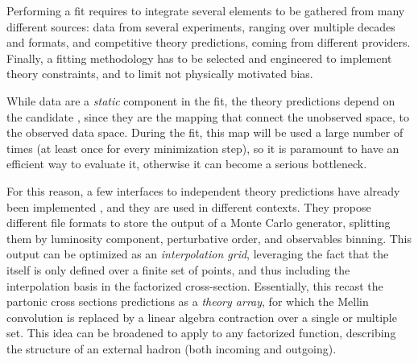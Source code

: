 
Performing a \pdf fit requires to integrate several elements to be gathered
from many different sources: data from several experiments, ranging over
multiple decades and formats, and competitive theory predictions, coming
from different providers.
Finally, a fitting methodology has to be selected and engineered to implement
theory constraints, and to limit not physically motivated bias.

While data are a \textit{static} component in the fit, the theory predictions
depend on the candidate \pdf, since they are the mapping that connect the
unobserved \pdf space, to the observed data space.
During the fit, this map will be used a large number of times (at least once
for every minimization step), so it is paramount to have an efficient way to
evaluate it, otherwise it can become a serious bottleneck.

For this reason, a few interfaces to \pdf independent theory predictions have
already been implemented
\cite{Carli:2010rw,Britzger:2012bs,Britzger:2022lbf,Carrazza:2020gss}, and they
are used in different contexts.
They propose different file formats to store the output of a Monte Carlo
generator, splitting them by luminosity component, perturbative order, and
observables binning.
This output can be optimized as an \textit{interpolation grid}, leveraging the
fact that the \pdf itself is only defined over a finite set of points, and thus
including the interpolation basis in the factorized cross-section.
Essentially, this recast the partonic cross sections predictions as
a \textit{theory array}, for which the Mellin convolution is replaced by a
linear algebra contraction over a single or multiple \pdf set.
This idea can be broadened to apply to any factorized function, describing the
structure of an external hadron (both incoming and outgoing).

